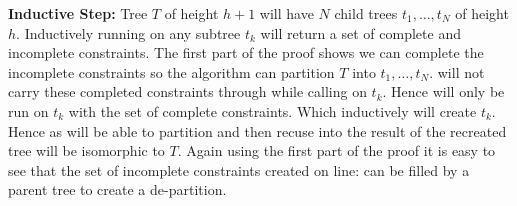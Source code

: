 \textbf{Inductive Step:} Tree $T$ of height $h+1$ will have $N$ child trees $t_1, \ldots, t_N$ of height $h$.
Inductively running  on any subtree $t_k$ will return a set of complete and incomplete constraints.
The first part of the proof shows we can complete the incomplete constraints so the  algorithm can partition $T$ into $t_1, \ldots, t_N$.
 will not carry these completed constraints through while calling  on $t_k$.
Hence  will only be run on $t_k$ with the set of complete constraints.
Which inductively will create $t_k$.
Hence as  will be able to partition and then recuse into the result of  the recreated tree will be isomorphic to $T$.
Again using the first part of the proof it is easy to see that the set of incomplete constraints created on line: can be filled by a parent tree to create a de-partition. 